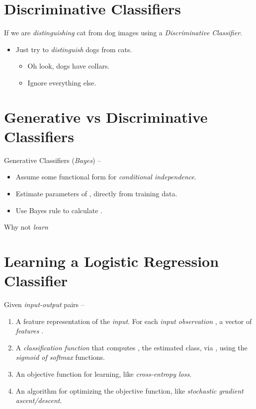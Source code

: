 \documentclass[
	title={Logistic Regression}
]{cs584notes}
\begin{document}
\section{Discriminative Classifiers}\label{sec:discriminative-classifiers}
If we are \emph{distinguishing} cat from dog images using a \emph{Discriminative Classifier}.
\begin{itemize}
	\item Just try to \emph{distinguish} dogs from cats.
	\begin{itemize}
		\item Oh look, dogs have collars.
		\item Ignore everything else.
	\end{itemize}
\end{itemize}

\section{Generative vs Discriminative Classifiers}\label{sec:generative-vs-discriminative-classifiers}
Generative Classifiers (\emph{\naive Bayes}) --
\begin{itemize}
	\item Assume some functional form for \emph{conditional independence}.
	\item Estimate parameters of ,  directly from training data.
	\item Use Bayes rule to calculate .
\end{itemize}

Why not \emph{learn}

\section{Learning a Logistic Regression Classifier}\label{sec:learning-a-logisitc-regression-classifier}
Given  \emph{input-output} pairs --
\begin{enumerate}
	\item A feature representation of the \emph{input}.
	For each \emph{input observation} , a vector of \emph{features} \data{$[x_{1}, x_{2}, \dots, x_{d}]$}.
	\item A \emph{classification function} that computes , the estimated class, via , using the \emph{sigmoid of softmax} functions.
	\item An objective function for learning, like \emph{cross-entropy loss}.
	\item An algorithm for optimizing the objective function, like \emph{stochastic gradient ascent/descent}.
\end{enumerate}
\end{document}
